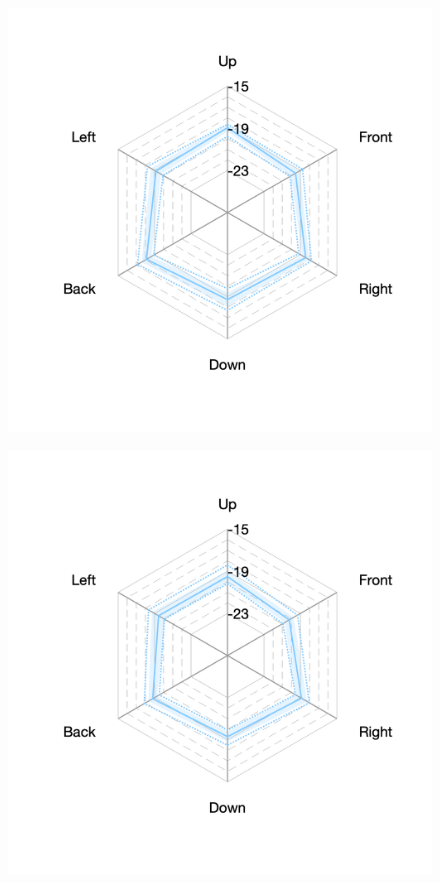 \documentclass[11pt,a4j]{jreport}
\begin{document}
\begin{figure}[H]
\begin{minipage}[b]{.33\textwidth}
        \label{fig:ホールEにおけるSTlate}
      \end{minipage}%
      \begin{minipage}[b]{.33\textwidth}
        \centering
        \includegraphics[width=1\linewidth]{images/realHallDirSt/late_hall_f_allpoints.png}
        \label{fig:ホールFにおけるSTlate}
      \end{minipage}

      \begin{minipage}[b]{.33\textwidth}
        \centering
        \includegraphics[width=1\linewidth]{images/realHallDirSt/late_hall_g_allpoints.png}
        \label{fig:ホールGにおけるSTlate}
      \end{minipage}


\end{figure}
\end{document}
